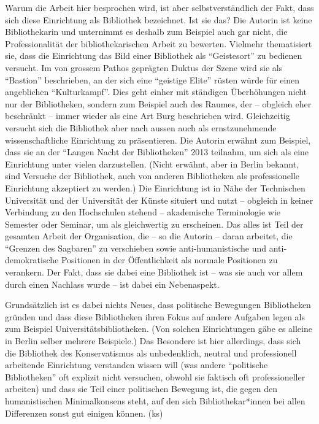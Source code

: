\documentclass[a4paper,
fontsize=11pt,
oneside,
numbers=noperiodatend,
parskip=half-,
bibliography=totoc,
final
]{scrartcl}
\begin{document}
Warum die Arbeit hier besprochen wird, ist aber selbstverständlich der
Fakt, dass sich diese Einrichtung als Bibliothek bezeichnet. Ist sie
das? Die Autorin ist keine Bibliothekarin und unternimmt es deshalb zum
Beispiel auch gar nicht, die Professionalität der bibliothekarischen
Arbeit zu bewerten. Vielmehr thematisiert sie, dass die Einrichtung das
Bild einer Bibliothek als \enquote{Geistesort} zu bedienen versucht. Im
von grossem Pathos geprägten Duktus der Szene wird sie als
\enquote{Bastion} beschrieben, an der sich eine \enquote{geistige Elite}
rüsten würde für einen angeblichen \enquote{Kulturkampf}. Dies geht
einher mit ständigen Überhöhungen nicht nur der Bibliotheken, sondern
zum Beispiel auch des Raumes, der -- obgleich eher beschränkt -- immer
wieder als eine Art Burg beschrieben wird. Gleichzeitig versucht sich
die Bibliothek aber nach aussen auch als ernstzunehmende
wissenschaftliche Einrichtung zu präsentieren. Die Autorin erwähnt zum
Beispiel, dass sie an der \enquote{Langen Nacht der Bibliotheken} 2013
teilnahm, um sich als eine Einrichtung unter vielen darzustellen. (Nicht
erwähnt, aber in Berlin bekannt, sind Versuche der Bibliothek, auch von
anderen Bibliotheken als professionelle Einrichtung akzeptiert zu
werden.) Die Einrichtung ist in Nähe der Technischen Universität und der
Universität der Künste situiert und nutzt -- obgleich in keiner
Verbindung zu den Hochschulen stehend -- akademische Terminologie wie
Semester oder Seminar, um als gleichwertig zu erscheinen. Das alles ist
Teil der gesamten Arbeit der Organisation, die -- so die Autorin --
daran arbeitet, die \enquote{Grenzen des Sagbaren} zu verschieben sowie
anti-humanistische und anti-demokratische Positionen in der
Öffentlichkeit als normale Positionen zu verankern. Der Fakt, dass sie
dabei eine Bibliothek ist -- was sie auch vor allem durch einen Nachlass
wurde -- ist dabei ein Nebenaspekt.

Grundsätzlich ist es dabei nichts Neues, dass politische Bewegungen
Bibliotheken gründen und dass diese Bibliotheken ihren Fokus auf andere
Aufgaben legen als zum Beispiel Universitätsbibliotheken. (Von solchen
Einrichtungen gäbe es alleine in Berlin selber mehrere Beispiele.) Das
Besondere ist hier allerdings, dass sich die Bibliothek des
Konservatismus als unbedenklich, neutral und professionell arbeitende
Einrichtung verstanden wissen will (was andere \enquote{politische
Bibliotheken} oft explizit nicht versuchen, obwohl sie faktisch oft
professioneller arbeiten) und dass sie Teil einer politischen Bewegung
ist, die gegen den humanistischen Minimalkonsens steht, auf den sich
Bibliothekar*innen bei allen Differenzen sonst gut einigen können. (ks)
\end{document}
